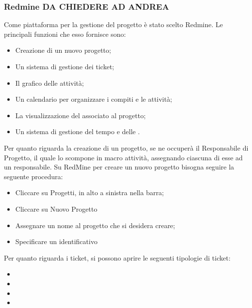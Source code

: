 \subsubsection{Redmine DA CHIEDERE AD ANDREA}
\label{4.1}
Come piattaforma per la gestione del progetto è stato scelto Redmine. Le principali funzioni che esso fornisce sono:
\begin{itemize}
\item Creazione di un nuovo progetto;
\item Un sistema di gestione dei ticket;
\item Il grafico  delle attività;
\item Un calendario per organizzare i compiti e le attività;
\item La visualizzazione del  associato al progetto;
\item Un sistema di  gestione del tempo e delle .
\end{itemize}
Per quanto riguarda la creazione di un progetto, se ne occuperà il Responsabile di Progetto, il quale lo scompone in macro attività, assegnando ciascuna di esse ad un responsabile.
Su RedMine per creare un nuovo progetto bisogna seguire la seguente procedura:
\begin{itemize}
\item Cliccare su Progetti, in alto a sinistra nella barra;
\item Cliccare su Nuovo Progetto
\item Assegnare un nome al progetto che si desidera creare;
\item Specificare un identificativo
\end{itemize}
Per quanto riguarda i ticket, si possono aprire le seguenti tipologie di ticket:
\begin{itemize}
\item {}
\item {}
\item {}
\item {}
\end{itemize}

